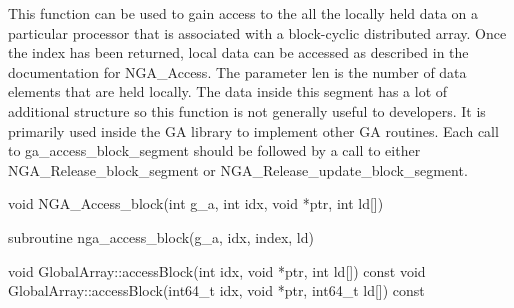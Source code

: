 \documentclass[10pt]{article}
\begin{document}
\begin{desc}

This function can be used to gain access to the all the locally held data on a
particular processor that is associated with a block-cyclic distributed array.
Once the index has been returned, local data can be accessed as described in
the documentation for NGA_Access. The parameter len is the number of data
elements that are held locally. The data inside this segment has a lot of
additional structure so this function is not generally useful to developers. It
is primarily used inside the GA library to implement other GA routines. Each
call to ga_access_block_segment should be followed by a call to either
NGA_Release_block_segment or NGA_Release_update_block_segment.

\end{desc}



\begin{capi}
\begin{ccode}
void NGA_Access_block(int g_a, int idx, void *ptr, int ld[])
\end{ccode}
\begin{funcargs}
\end{funcargs}
\end{capi}

\begin{fapi}
\begin{fcode}
subroutine nga_access_block(g_a, idx, index, ld)
\end{fcode}
\begin{funcargs}
\end{funcargs}
\end{fapi}

\begin{cxxapi}
\begin{cxxcode}
void GlobalArray::accessBlock(int idx, void *ptr, int ld[]) const
void GlobalArray::accessBlock(int64_t idx, void *ptr, int64_t ld[]) const
\end{cxxcode}
\begin{funcargs}
\end{funcargs}
\end{cxxapi}
\end{document}
